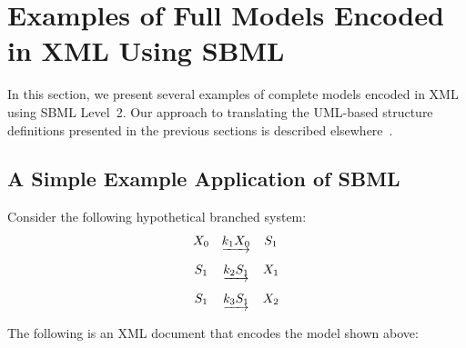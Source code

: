 \documentclass[10pt]{cekarticle}
\begin{document}
\section{Examples of Full Models Encoded in XML Using SBML}
\label{sec:xml-rep}

In this section, we present several examples of complete models
encoded in XML using SBML Level~2.  Our approach to translating
the UML-based structure definitions presented in the previous
sections is described elsewhere~\citep{hucka:2000b}.


\subsection{A Simple Example Application of SBML}
\label{sec:modeleg}

Consider the following hypothetical branched system:
\begin{equation*}
  \begin{array}{@{}ccc@{}}
    X_0 & \underrightarrow{k_1 X_0} & S_1 \\ \\[-4pt]
    S_1 & \underrightarrow{k_2 S_1} & X_1 \\ \\[-4pt]
    S_1 & \underrightarrow{k_3 S_1} & X_2
  \end{array}
\end{equation*}

The following is an XML document that encodes the model shown
above:
\end{document}
